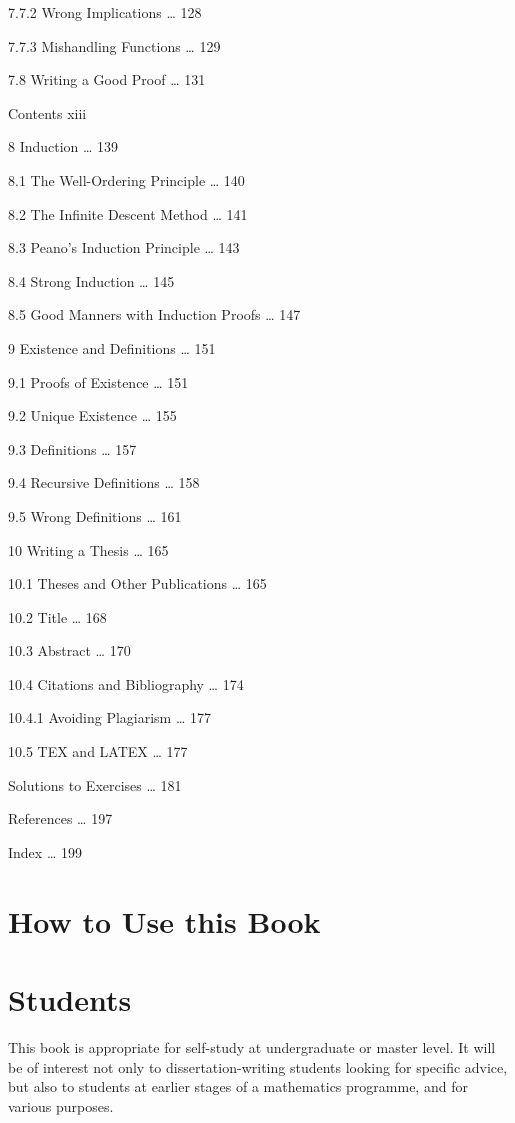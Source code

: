 \documentclass[11pt]{article}
\theoremstyle{plain}
\theoremstyle{definition}
\begin{document}
7.7.2 Wrong Implications \dots{} 128

7.7.3 Mishandling Functions \dots{} 129

7.8 Writing a Good Proof \dots{} 131

Contents xiii

8 Induction \dots{} 139

8.1 The Well-Ordering Principle \dots{} 140

8.2 The Infinite Descent Method \dots{} 141

8.3 Peano's Induction Principle \dots{} 143

8.4 Strong Induction \dots{} 145

8.5 Good Manners with Induction Proofs \dots{} 147

9 Existence and Definitions \dots{} 151

9.1 Proofs of Existence \dots{} 151

9.2 Unique Existence \dots{} 155

9.3 Definitions \dots{} 157

9.4 Recursive Definitions \dots{} 158

9.5 Wrong Definitions \dots{} 161

10 Writing a Thesis \dots{} 165

10.1 Theses and Other Publications \dots{} 165

10.2 Title \dots{} 168

10.3 Abstract \dots{} 170

10.4 Citations and Bibliography \dots{} 174

10.4.1 Avoiding Plagiarism \dots{} 177

10.5 TEX and LATEX \dots{} 177

Solutions to Exercises \dots{} 181

References \dots{} 197

Index \dots{} 199

\section{How to Use this Book}

\section{Students}

This book is appropriate for self-study at undergraduate or master level. It will be of interest not only to dissertation-writing students looking for specific advice, but also to students at earlier stages of a mathematics programme, and for various purposes.
\end{document}
